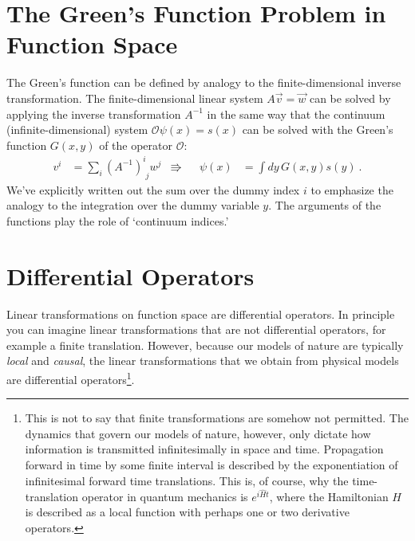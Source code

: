 \documentclass[
  11pt,
	colorful,
	raggedright,
]{tufte-style-thesis-flip}
\newcommand{\aij}[2]{^{#1}_{\phantom{#1}#2}}
\newcommand{\mat}[3]{#1\aij{#2}{#3}}
\begin{document}
\section{The Green's Function Problem in Function Space}

The Green's function can be defined by analogy to the finite-dimensional inverse transformation. The finite-dimensional linear system $A\vec v = \vec w$ can be solved by applying the inverse transformation $A^{-1}$ in the same way that the continuum (infinite-dimensional) system $\mathcal O \psi(x) = s(x)$ can be solved with the Green's function $G(x,y)$ of the operator $\mathcal O$:
\begin{align}
  v^i &= \sum_i 
  \mat{\left(A^{-1}\right)}{i}{j} w^j
  &\Rrightarrow
  &
  &
  \psi(x) &= \int  dy\, G(x,y) s(y) \ .
  \label{eq:def:of:function:space:Greens:function}
\end{align}
We've explicitly written out the sum over the dummy index $i$ to emphasize the analogy to the integration over the dummy variable $y$. The arguments of the functions play the role of `continuum indices.'

\section{Differential Operators}

Linear transformations on function space are differential operators. In principle you can imagine linear transformations that are not differential operators, for example a finite translation. However, because our models of nature are typically \emph{local} and \emph{causal}, the linear transformations that we obtain from physical models are differential operators\footnote{This is not to say that finite transformations are somehow not permitted. The dynamics that govern our models of nature, however, only dictate how information is transmitted infinitesimally in space and time. Propagation forward in time by some finite interval is described by the exponentiation of infinitesimal forward time translations. This is, of course, why the time-translation operator in quantum mechanics is $e^{i\hat H t}$, where the Hamiltonian $H$ is described as a local function with perhaps one or two derivative operators.}. 
\end{document}
